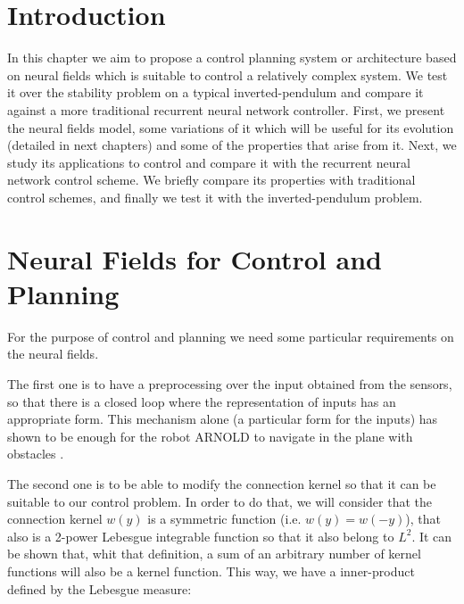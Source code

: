 \section{Introduction} 
In this chapter we aim to propose a control planning system or
architecture based on neural fields which is suitable to control a
relatively complex system. We test it over the stability problem on a
typical inverted-pendulum and compare it against a more traditional
recurrent neural network controller. First, we present the neural
fields model, some variations of it which will be useful for its
evolution (detailed in next chapters) and some of the properties that
arise from it. Next, we study its applications to control and compare
it with the recurrent neural network control scheme. We briefly
compare its properties with traditional control schemes, and finally
we test it with the inverted-pendulum problem.


\section{Neural Fields for Control and Planning}
For the purpose of control and planning we need some particular
requirements on the neural fields.

The first one is to have a preprocessing over the input
obtained from the sensors, so that there is a closed loop where the
representation of inputs has an appropriate form. This mechanism alone
(a particular form for the inputs) has shown to be enough for the robot
ARNOLD to navigate in the plane with obstacles
\cite{Bergener99Complex}.

The second one is to be able to modify the connection kernel so that
it can be suitable to our control problem. In order to do that, we
will consider that the connection kernel $w(y)$ is a symmetric
function (i.e. $w(y)=w(-y)$), that also is a 2-power Lebesgue
integrable function so that it also belong to $L^2$. It can be shown
that, whit that definition, a sum of an arbitrary number of kernel
functions will also be a kernel function. This way, we have a
inner-product defined by the Lebesgue measure:

